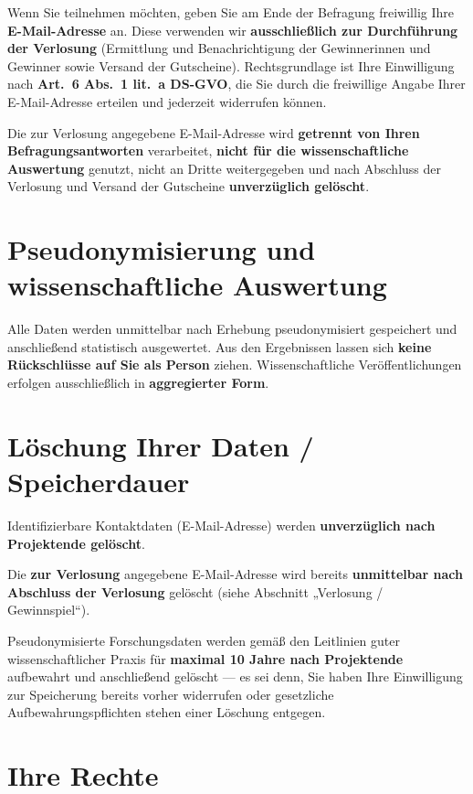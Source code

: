 \documentclass[11pt,a4paper,parskip=half,DIV=12]{scrartcl}
\begin{document}
Wenn Sie teilnehmen möchten, geben Sie am Ende der Befragung freiwillig Ihre \textbf{E-Mail-Adresse} an. Diese verwenden wir \textbf{ausschließlich zur Durchführung der Verlosung} (Ermittlung und Benachrichtigung der Gewinnerinnen und Gewinner sowie Versand der Gutscheine). Rechtsgrundlage ist Ihre Einwilligung nach \textbf{Art.~6 Abs.~1 lit.~a DS-GVO}, die Sie durch die freiwillige Angabe Ihrer E-Mail-Adresse erteilen und jederzeit widerrufen können.

Die zur Verlosung angegebene E-Mail-Adresse wird \textbf{getrennt von Ihren Befragungs\-antworten} verarbeitet, \textbf{nicht für die wissenschaftliche Auswertung} genutzt, nicht an Dritte weitergegeben und nach Abschluss der Verlosung und Versand der Gutscheine \textbf{unverzüglich gelöscht}.

\section*{Pseudonymisierung und wissenschaftliche Auswertung}

Alle Daten werden unmittelbar nach Erhebung pseudonymisiert gespeichert und anschließend statistisch ausgewertet. Aus den Ergebnissen lassen sich \textbf{keine Rückschlüsse auf Sie als Person} ziehen. Wissenschaftliche Veröffentlichungen erfolgen ausschließlich in \textbf{aggregierter Form}.

\section*{Löschung Ihrer Daten / Speicherdauer}

Identifizierbare Kontaktdaten (E-Mail-Adresse) werden \textbf{unverzüglich nach Projektende gelöscht}.

Die \textbf{zur Verlosung} angegebene E-Mail-Adresse wird bereits \textbf{unmittelbar nach Abschluss der Verlosung} gelöscht (siehe Abschnitt „Verlosung / Gewinnspiel“).

Pseudonymisierte Forschungsdaten werden gemäß den Leitlinien guter wissenschaftlicher Praxis für \textbf{maximal 10 Jahre nach Projektende} aufbewahrt und anschließend gelöscht --- es sei denn, Sie haben Ihre Einwilligung zur Speicherung bereits vorher widerrufen oder gesetzliche Aufbewahrungs\-pflichten stehen einer Löschung entgegen.

\section*{Ihre Rechte}
\end{document}
